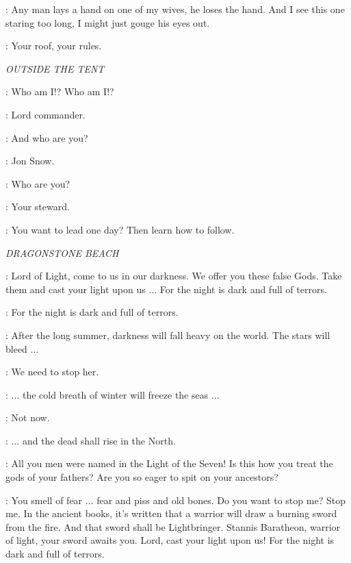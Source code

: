 \CRASTER: Any man lays a hand on one of my wives, he loses the hand. And I see this one staring too long, I might just gouge his eyes out.

\JEOR: Your roof, your rules.


\scene

\textit{OUTSIDE THE TENT}

\JEOR: Who am I!? Who am I!?

\JON: Lord commander.

\JEOR: And who are you?

\JON: Jon Snow.

\JEOR: Who are you?

\JON: Your steward.

\JEOR: You want to lead one day? Then learn how to follow.


\scene

\textit{DRAGONSTONE BEACH}


\MELISANDRE: Lord of Light, come to us in our darkness. We offer you these false Gods. Take them and cast your light upon us $\ldots$ For the night is dark and full of terrors.

\CROWD: For the night is dark and full of terrors.

\MELISANDRE: After the long summer, darkness will fall heavy on the world. The stars will bleed $\ldots$

\CRESSEN:  We need to stop her.

\MELISANDRE: $\ldots$ the cold breath of winter will freeze the seas $\ldots$

\DAVOS: Not now.

\MELISANDRE: $\ldots$ and the dead shall rise in the North.

\CRESSEN:  All you men were named in the Light of the Seven! Is this how you treat the gods of your fathers? Are you so eager to spit on your ancestors?

\MELISANDRE: You smell of fear $\ldots$ fear and piss and old bones. Do you want to stop me? Stop me. In the ancient books, it's written that a warrior will draw a burning sword from the fire. And that sword shall be Lightbringer. Stannis Baratheon, warrior of light, your sword awaits you.  Lord, cast your light upon us! For the night is dark and full of terrors.

